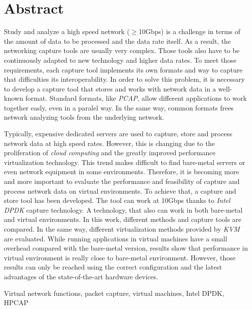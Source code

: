 \chapter*{Abstract}

\begin{abstractEn}
Study and analyze a high speed network ($\geq$10Gbps) is a challenge in terms of the amount of data to be processed and the data rate itself. As a result, the networking capture tools are usually very complex. Those tools also have to be continuously adapted to new technology and higher data rates. To meet those requirements, each capture tool implements its own formats and way to capture that difficulties its interoperability. In order to solve this problem, it is necessary to develop a capture tool that stores and works with network data in a well-known format. Standard formats, like \textit{PCAP}, allow different applications to work together easly, even in a paralel way. In the same way, common formats frees network analyzing tools from the underlying network.

Typically, expensive dedicated servers are used to capture, store and process network data at high speed rates. However, this is changing due to the proliferation of \textit{cloud computing} and the greatly improved performance virtualization technology. This trend makes difficult to find bare-metal servers or even network equipment in some environments. Therefore, it is becoming more and more important to evaluate the performance and feasibility of capture and process network data on virtual environments. To achieve that, a capture and store tool has been developed.
The tool can work at 10Gbps thanks to \textit{Intel DPDK} capture technology. A technology, that also can work in both bare-metal and virtual environments.
In this work, different methods and capture tools are compared. In the same way, different virtualization methods provided by \textit{KVM} are evaluated.
While running applications in virtual machines have a small overhead compared with the bare-metal version, results show that performance in virtual environment is really close to bare-metal environment. However, those results can only be reached using the correct configuration and the latest advantages of the state-of-the-art hardware devices.
\end{abstractEn}

\begin{keywordsEn}
Virtual network functions, packet capture, virtual machines, Intel DPDK, HPCAP
\end{keywordsEn}

